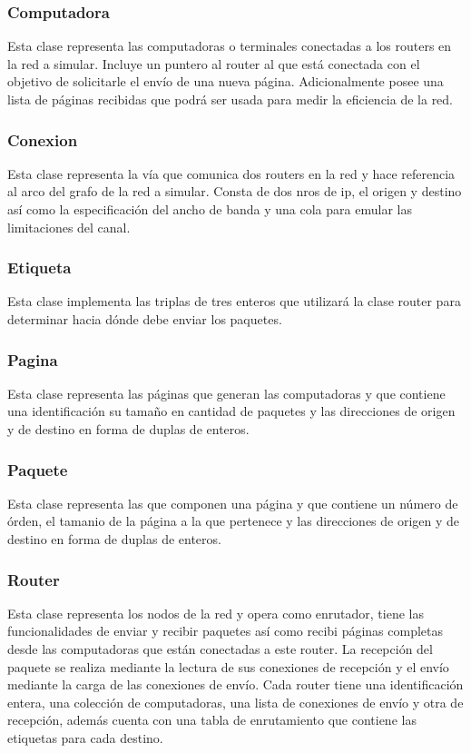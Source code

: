 \documentclass[12pt]{article} %
\begin{document}
\subsubsection{Computadora}
Esta clase representa las computadoras o terminales conectadas a los routers en la red a simular. Incluye un puntero al router al que está conectada con el objetivo de solicitarle el envío de una nueva página. Adicionalmente posee una lista de páginas recibidas que podrá ser usada para medir la eficiencia de la red.
\subsubsection{Conexion}
Esta clase representa la vía que comunica dos routers en la red y hace referencia al arco del grafo de la red a simular. Consta de dos nros de ip, el origen y destino así como la especificación del ancho de banda y una cola para emular las limitaciones del canal. 
\subsubsection{Etiqueta}
Esta clase implementa las triplas de tres enteros que utilizará la clase router para determinar hacia dónde debe enviar los paquetes.
\subsubsection{Pagina}
Esta clase representa las páginas que generan las computadoras y que contiene una identificación su tamaño en cantidad de paquetes y las direcciones de origen y de destino en forma de duplas de enteros.
\subsubsection{Paquete}
Esta clase representa las que componen una página y que contiene un número de órden, el tamanio de la página a la que pertenece y las direcciones de origen y de destino en forma de duplas de enteros.
\subsubsection{Router}
Esta clase representa los nodos de la red y opera como enrutador, tiene las funcionalidades de enviar y recibir paquetes así como recibi páginas completas desde las computadoras que están conectadas a este router. La recepción del paquete se realiza mediante la lectura de sus conexiones de recepción y el envío mediante la carga de las conexiones de envío. Cada router tiene una identificación entera, una colección de computadoras, una lista de conexiones de envío y otra de recepción, además cuenta con una tabla de enrutamiento que contiene las etiquetas para cada destino.
\end{document}
